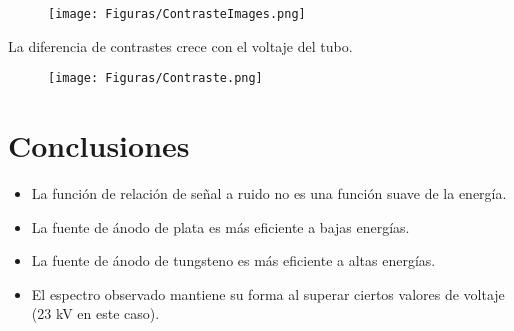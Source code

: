 \documentclass{sciposter}
\begin{document}
\begin{multicols}{3}
	\begin{figure}[h]
		\centering
		\texttt{[image: Figuras/ContrasteImages.png]}
	\end{figure}
	
	La diferencia de contrastes crece con el voltaje del tubo.
	
	\begin{figure}[h]
		\centering
		\texttt{[image: Figuras/Contraste.png]}
	\end{figure}

\section{Conclusiones}

\begin{itemize}
	\item La función de relación de señal a ruido no es una función suave de la energía.
	\item La fuente de ánodo de plata es más eficiente a bajas energías.
	\item La fuente de ánodo de tungsteno es más eficiente a altas energías.
	\item El espectro observado mantiene su forma al superar ciertos valores de voltaje (23 kV en este caso).
\end{itemize}
%	 
	
\nocite{als2011elements,amtek,ballabriga2011medipix3,exper,koningsberger1988x,manualT,mendenhall2017high,mini,param,range,van2014scikit,xps}

\tiny


\end{multicols}
\end{document}
